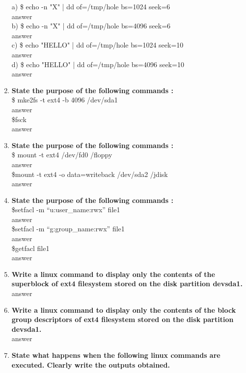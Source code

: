 \documentclass[a4paper,12pt]{article}
\begin{document}
\begin{flushleft}
\begin{enumerate}
a) \$ echo -n "X" | dd of=/tmp/hole bs=1024 seek=6\\
{\color{red}answer}\\
b) \$ echo -n "X" | dd of=/tmp/hole bs=4096 seek=6\\
{\color{red}answer}\\
c) \$ echo "HELLO" | dd of=/tmp/hole bs=1024 seek=10\\
{\color{red}answer}\\
d) \$ echo "HELLO" | dd of=/tmp/hole bs=4096 seek=10\\
{\color{red}answer}\\
\item \textbf{ State the purpose of the following commands :}\\
\$ mke2fs -t ext4 -b 4096 /dev/sda1\\
{\color{red}answer}\\
\$fsck\\
{\color{red}answer}\\
\item \textbf{ State the purpose of the following commands :}\\
\$ mount -t ext4 /dev/fd0 /floppy\\
{\color{red}answer}\\
\$mount -t ext4 -o data=writeback /dev/sda2 /jdisk\\
{\color{red}answer}\\
\item \textbf{ State the purpose of the following commands :}\\
\$setfacl -m “u:user\_name:rwx” file1\\
{\color{red}answer}\\
\$setfacl -m “g:group\_name:rwx” file1\\
{\color{red}answer}\\
\$getfacl file1\\
{\color{red}answer}\\
\item \textbf{ Write a linux command to display only the contents of the superblock of ext4 filesystem stored on the disk partition \/dev\/sda1.}\\
{\color{red}answer}\\
\item \textbf{ Write a linux command to display only the contents of the block group descriptors of ext4 filesystem stored on the disk partition \/dev\/sda1.}\\
{\color{red}answer}\\
\item \textbf{ State what happens when the following linux commands are executed. Clearly write the outputs obtained.}\\

\end{enumerate}
\end{flushleft}
\end{document}
